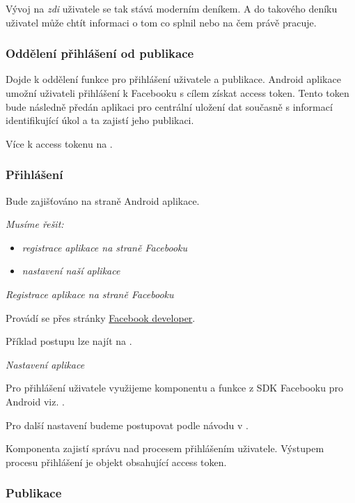\documentclass[thesis=B,czech]{FITthesis}[2012/06/26]
\begin{document}
Vývoj na \textit{zdi} uživatele se tak stává moderním deníkem. A do takového deníku uživatel může chtít informaci o tom co splnil nebo na čem právě pracuje.

\subsubsection{Oddělení přihlášení od publikace}
\label{design:facebook_divide_appliaction}
	
Dojde k oddělení funkce pro přihlášení uživatele a publikace.
Android aplikace umožní uživateli přihlášení k Facebooku s cílem získat access token. Tento token bude následně předán aplikaci pro centrální uložení dat současně s informací identifikující úkol a ta zajistí jeho publikaci.

Více k access tokenu na \cite{design_facebook_access_tokens}.

\subsubsection{Přihlášení}

Bude zajišťováno na straně Android aplikace.

\textit{Musíme řešit:}
\begin{itemize}[nosep]
	\item \textit{registrace aplikace na straně Facebooku}
	\item \textit{nastavení naší aplikace}
\end{itemize}

\textit{Registrace aplikace na straně Facebooku}

Provádí se přes stránky \href{''https://developers.facebook.com/''}{Facebook developer}\cite{design_facebook_developer}.

Příklad postupu lze najít na \cite{design_facebook_registration_example}. 

\textit{Nastavení aplikace}

Pro přihlášení uživatele využijeme komponentu a funkce z SDK Facebooku pro Android viz. 
\label{technology:facebook_sdk}.

Pro další nastavení budeme postupovat podle návodu v \cite{design_facebook_android_login}.

Komponenta zajistí správu nad procesem přihlášením uživatele. Výstupem procesu přihlášení je objekt obsahující access token.

\subsubsection{Publikace}
\end{document}
